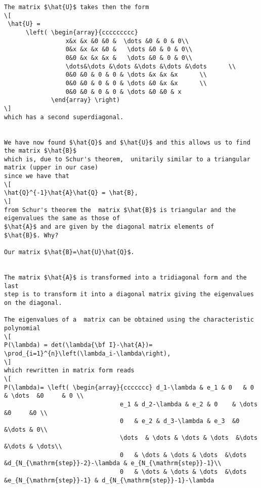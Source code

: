 {\begin{lstlisting}
The matrix $\hat{U}$ takes then the form
\[
 \hat{U} =
      \left( \begin{array}{ccccccccc} 
                 x&x &x &0 &0 &  \dots &0 & 0 & 0\\
                 0&x &x &x &0 &   \dots &0 & 0 & 0\\
                 0&0 &x &x &x &   \dots &0 & 0 & 0\\
                 \dots&\dots &\dots &\dots &\dots &\dots      \\
                 0&0 &0 & 0 & 0 & \dots &x &x &x      \\
                 0&0 &0 & 0 & 0 & \dots &0 &x &x      \\
                 0&0 &0 & 0 & 0 & \dots &0 &0 & x  
             \end{array} \right)
\]
which has a second superdiagonal.


We have now found $\hat{Q}$ and $\hat{U}$ and this allows us to find the matrix $\hat{B}$
which is, due to Schur's theorem,  unitarily similar to a triangular matrix (upper in our case) 
since we have that 
\[
\hat{Q}^{-1}\hat{A}\hat{Q} = \hat{B}, 
\]
from Schur's theorem the  matrix $\hat{B}$ is triangular and the eigenvalues the same as those of 
$\hat{A}$ and are given by the diagonal matrix elements of 
$\hat{B}$. Why?  

Our matrix $\hat{B}=\hat{U}\hat{Q}$. 


The matrix $\hat{A}$ is transformed into a tridiagonal form and the last
step is to transform it into a diagonal matrix giving the eigenvalues
on the diagonal. 

The eigenvalues of a  matrix can be obtained using the characteristic polynomial 
\[
P(\lambda) = det(\lambda{\bf I}-\hat{A})= \prod_{i=1}^{n}\left(\lambda_i-\lambda\right),
\]
which rewritten in matrix form reads 
\[
P(\lambda)= \left( \begin{array}{ccccccc} d_1-\lambda & e_1 & 0   & 0    & \dots  &0     & 0 \\
                                e_1 & d_2-\lambda & e_2 & 0    & \dots  &0     &0 \\
                                0   & e_2 & d_3-\lambda & e_3  &0       &\dots & 0\\
                                \dots  & \dots & \dots & \dots  &\dots      &\dots & \dots\\
                                0   & \dots & \dots & \dots  &\dots       &d_{N_{\mathrm{step}}-2}-\lambda & e_{N_{\mathrm{step}}-1}\\
                                0   & \dots & \dots & \dots  &\dots       &e_{N_{\mathrm{step}}-1} & d_{N_{\mathrm{step}}-1}-\lambda


\end{lstlisting}}
